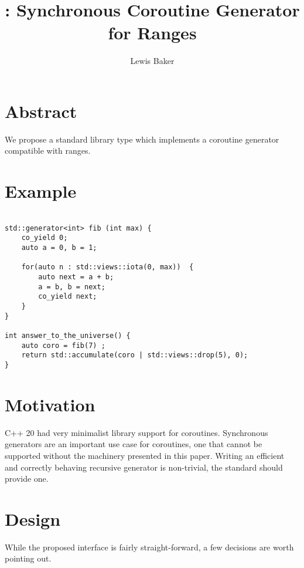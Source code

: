 \documentclass{wg21}
\title{\tcode{std::generator}: Synchronous Coroutine Generator for Ranges}
\author{Lewis Baker}{lbaker@fb.com }
\begin{document}
\maketitle


\section{Abstract}

We propose a standard library type  which implements a coroutine generator compatible with ranges.

\section{Example}
\begin{lstlisting}[style=color]

std::generator<int> fib (int max) {
    co_yield 0;
    auto a = 0, b = 1;
    
    for(auto n : std::views::iota(0, max))  {
        auto next = a + b;
        a = b, b = next;
        co_yield next;
    }
}

int answer_to_the_universe() {
    auto coro = fib(7) ;
    return std::accumulate(coro | std::views::drop(5), 0);
}

\end{lstlisting}

\section{Motivation}

C++ 20 had very minimalist library support for coroutines.
Synchronous generators are an important use case for coroutines, one that cannot be supported without 
the machinery presented in this paper.
Writing an efficient and correctly behaving recursive generator is non-trivial, the standard should provide one.

 
\section{Design}

While the proposed  interface is fairly straight-forward, a few decisions are worth pointing out.

\subsection{}
\end{document}
